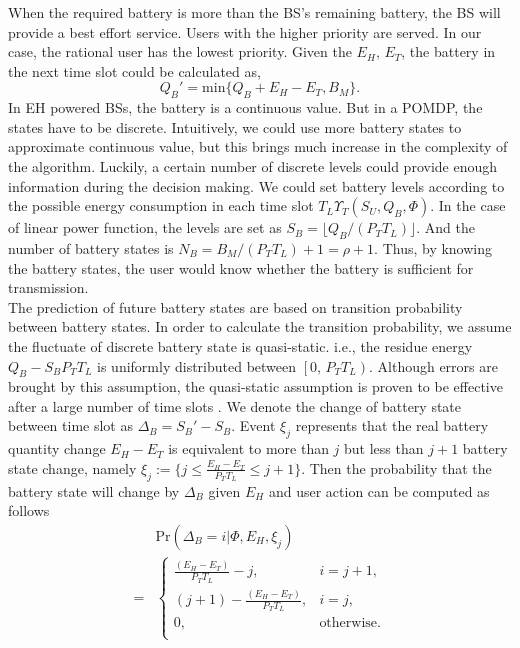 \documentclass[journal,12pt,draftclsnofoot,onecolumn]{IEEEtran}
\begin{document}
When the required battery is more than the BS's remaining battery,
the BS will provide a best effort service.
Users with the higher priority are served.
In our case, the rational user has the lowest priority.
Given the \(E_H,\,E_T\), the battery in the next time slot could be calculated as,
\begin{equation}
	Q_B' = \mbox{min}\{Q_B + E_H - E_T, B_M\}.
\end{equation}
\indent In EH powered BSs, the battery is a continuous value.
But in a POMDP, the states have to be discrete.
Intuitively, we could use more battery states to approximate continuous value,
but this brings much increase in the complexity of the algorithm.
Luckily, a certain number of discrete levels could provide enough information during the decision making.
We could set battery levels according to the possible energy consumption in each time slot \(T_L\Upsilon_T(S_U,Q_B,\Phi)\).
In the case of linear power function, the levels are set as \(S_B = \lfloor Q_B / \left(P_TT_L\right) \rfloor\).
And the number of battery states is \(N_B = B_M / \left(P_TT_L\right) +1 = \rho + 1\).
Thus, by knowing the battery states,
the user would know whether the battery is sufficient for transmission.\\
\indent
The prediction of future battery states are based on transition probability between battery states.
In order to calculate the transition probability,
we assume the fluctuate of discrete battery state is quasi-static.
i.e., the residue energy \(Q_B - S_BP_TT_L\) is uniformly distributed between \(\left[0,\,P_TT_L\right)\).
Although errors are brought by this assumption, the quasi-static assumption is proven to be effective after a large number of time slots \cite{data}.
We denote the change of battery state between time slot as \(\Delta_B = S_{B}' - S_B\).
Event \(\xi_j\) represents that the real battery quantity change \(E_H - E_T\)
is equivalent to more than \(j\) but less than \(j+1\) battery state change, namely
\(\xi_j := \{j\leq \frac{E_H - E_T}{P_TT_L} \le j+1\}\).
Then the probability that the battery state will change by \(\Delta_B\)
given \(E_H\) and user action can be computed as follows
\begin{align}&\mbox{Pr}\left(\Delta_B = i |\Phi, E_H, \xi_j \right)\nonumber\\
=&\begin{cases} \frac{\left(E_H - E_T\right)}{P_TT_L} -j, &\mbox{$i = j + 1$},\\
\left(j+1\right) -\frac{\left(E_H - E_T\right)} {P_TT_L}, &\mbox{$i = j$},\\
0, &\mbox{otherwise.}\\
\end{cases}
\end{align}
\end{document}
